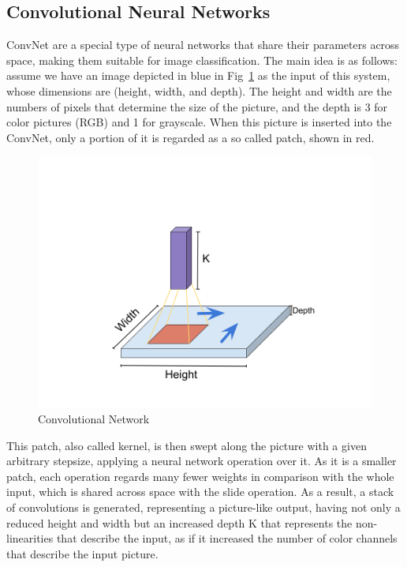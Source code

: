 \subsection{Convolutional Neural Networks}

\ac{ConvNet} are a special type of neural networks that share their parameters across space, making them suitable for image classification. The main idea is as follows: assume we have an image depicted in blue in Fig~\ref{fig:convolutionalnetwork} as the input of this system, whose dimensions are (height, width, and depth). The height and width are the numbers of pixels that determine the size of the picture, and the depth is 3 for color pictures (RGB) and 1 for grayscale. When this picture is inserted into the \ac{ConvNet}, only a portion of it is regarded as a so called patch, shown in red.

\begin{figure}[t!]
    \centering
      \includegraphics[width=\textwidth]{figures/convolutionalnetwork}
      \caption{Convolutional Network}
      \label{fig:convolutionalnetwork}
\end{figure}

This patch, also called kernel, is then swept along the picture with a given arbitrary stepsize, applying a neural network operation over it. As it is a smaller patch, each operation regards many fewer weights in comparison with the whole input, which is shared across space with the slide operation. As a result, a stack of convolutions is generated, representing a picture-like output, having not only a reduced height and width but an increased depth K that represents the non-linearities that describe the input, as if it increased the number of color channels that describe the input picture.\\

